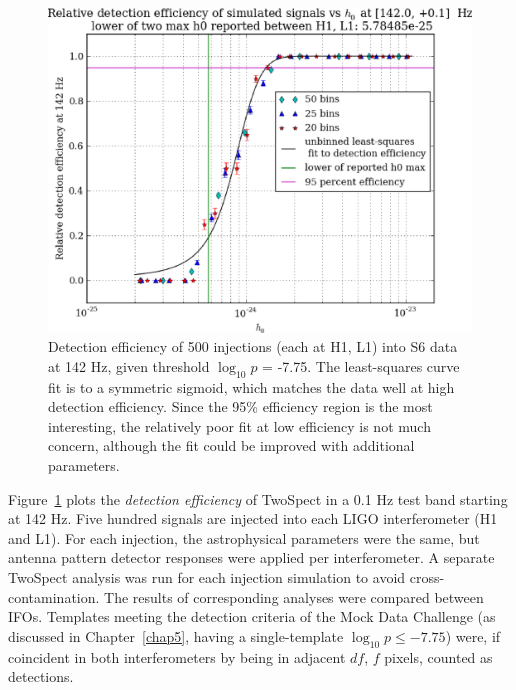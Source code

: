 \begin{figure}
\begin{center}
\includegraphics[width=0.70\paperwidth,height=0.48\paperheight]{plots/detectionEfficiencyh0-142-0Hz.eps}
\caption{Detection efficiency of 500 injections (each at H1, L1) into
S6 data at 142 Hz, given threshold $\log_{10}p$ = -7.75.
The least-squares curve fit is to a symmetric sigmoid, which matches the data well at high detection efficiency.
Since the 95\% efficiency region is the most interesting, the relatively poor fit at low efficiency is not much concern, although the fit could be improved with additional parameters.}
\label{S6_det_eff_142}
\end{center}
\end{figure}

Figure~\ref{S6_det_eff_142} plots the \textit{detection efficiency} of TwoSpect in a 0.1 Hz test band starting at 142 Hz.
Five hundred signals are injected into each LIGO interferometer (H1 and L1).
For each injection, the astrophysical parameters were the same, but antenna pattern detector responses were applied per interferometer.
A separate TwoSpect analysis was run for each injection simulation to avoid cross-contamination.
The results of corresponding analyses were compared between IFOs.
Templates meeting the detection criteria of the Mock Data Challenge (as discussed in Chapter~\ref{chap5}, having a single-template $\log_{10} p \leq -7.75$) were, if coincident in both interferometers by being in adjacent $df$, $f$ pixels, counted as detections.

